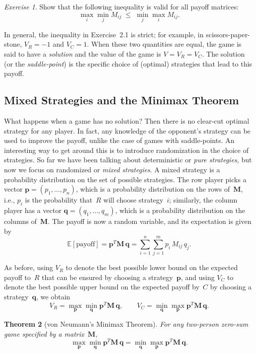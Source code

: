 \documentclass[twoside,12pt]{book}
\theoremstyle{plain}
\newtheorem{theorem}{Theorem}[chapter]
\theoremstyle{definition}
\theoremstyle{remark}
\newtheorem{exercise}[theorem]{Exercise}
\begin{document}
\begin{exercise}
Show that the following inequality is valid for all payoff matrices:
\[
  \max_i \min_j M_{ij} \;\le\; \min_j \max_i M_{ij}.
\]
\end{exercise}

In general, the inequality in Exercise~2.1 is strict; for example, in
scissors-paper-stone, $V_R=-1$ and $V_C=1$.  When these two quantities are
equal, the game is said to have a \emph{solution} and the value of the game
is $V=V_R=V_C$.  The solution (or the \emph{saddle-point}) is the specific
choice of (optimal) strategies that lead to this payoff.

\subsection{Mixed Strategies and the Minimax Theorem}

What happens when a game has no solution?  Then there is no clear-cut optimal
strategy for any player.  In fact, any knowledge of the opponent's strategy
can be used to improve the payoff, unlike the case of games with
saddle-points.  An interesting way to get around this is to introduce
randomization in the choice of strategies.  So far we have been talking about
deterministic or \emph{pure strategies}, but now we focus on randomized or
\emph{mixed strategies}.  A mixed strategy is a probability distribution on
the set of possible strategies.  The row player picks a vector
$\mathbf{p}=(p_1,\ldots,p_n)$, which is a probability distribution on the
rows of~$\mathbf{M}$, i.e., $p_i$ is the probability that~$R$ will choose
strategy~$i$; similarly, the column player has a vector
$\mathbf{q}=(q_1,\ldots,q_m)$, which is a probability distribution on the
columns of~$\mathbf{M}$.  The payoff is now a random variable, and its
expectation is given by
\[
  \mathbb{E}[\text{payoff}]
  = \mathbf{p}^T \mathbf{M}\, \mathbf{q}
  = \sum_{i=1}^{n}\sum_{j=1}^{m} p_i\, M_{ij}\, q_j.
\]

As before, using $V_R$ to denote the best possible lower bound on the
expected payoff to~$R$ that can be ensured by choosing a strategy~$\mathbf{p}$,
and using $V_C$ to denote the best possible upper bound on the expected
payoff by~$C$ by choosing a strategy~$\mathbf{q}$, we obtain
\[
  V_R = \max_{\mathbf{p}} \min_{\mathbf{q}} \mathbf{p}^T\mathbf{M}\,\mathbf{q},
  \qquad
  V_C = \min_{\mathbf{q}} \max_{\mathbf{p}} \mathbf{p}^T\mathbf{M}\,\mathbf{q}.
\]

\begin{theorem}[von Neumann's Minimax Theorem]
\label{thm:neumann}
For any two-person zero-sum game specified by a matrix~$\mathbf{M}$,
\[
  \max_{\mathbf{p}} \min_{\mathbf{q}} \mathbf{p}^T\mathbf{M}\,\mathbf{q}
  = \min_{\mathbf{q}} \max_{\mathbf{p}} \mathbf{p}^T\mathbf{M}\,\mathbf{q}.
\]
\end{theorem}
\end{document}
